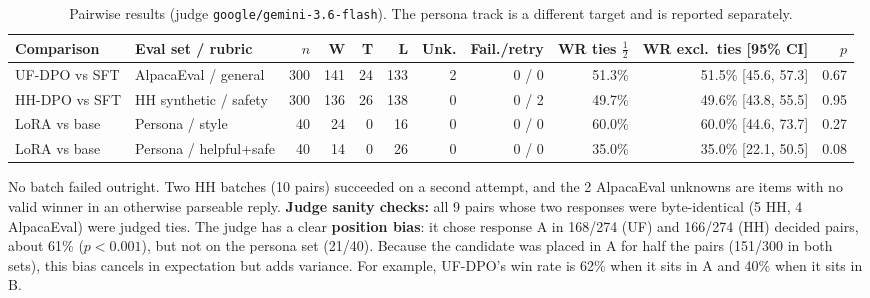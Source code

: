 \documentclass[10pt]{article}
\newcommand{\code}[1]{\texttt{\small #1}}
\begin{document}
\begin{table}[h]
\centering\footnotesize
\setlength{\tabcolsep}{4pt}
\setlength{\tabcolsep}{2.6pt}
\caption{Pairwise results (judge \code{google/gemini-3.6-flash}). The persona track is a different target and is reported separately.}
\label{tab:res}
\begin{tabular}{@{}l l r r r r r r r r r@{}}
\toprule
Comparison & Eval set / rubric & $n$ & W & T & L & Unk. & Fail./retry & WR ties $\frac12$ & WR excl.\ ties [95\% CI] & $p$ \\
\midrule
UF-DPO vs SFT & AlpacaEval / general & 300 & 141 & 24 & 133 & 2 & 0 / 0 & 51.3\% & 51.5\% [45.6, 57.3] & 0.67 \\
HH-DPO vs SFT & HH synthetic / safety & 300 & 136 & 26 & 138 & 0 & 0 / 2 & 49.7\% & 49.6\% [43.8, 55.5] & 0.95 \\
\midrule
LoRA vs base & Persona / style & 40 & 24 & 0 & 16 & 0 & 0 / 0 & 60.0\% & 60.0\% [44.6, 73.7] & 0.27 \\
LoRA vs base & Persona / helpful+safe & 40 & 14 & 0 & 26 & 0 & 0 / 0 & 35.0\% & 35.0\% [22.1, 50.5] & 0.08 \\
\bottomrule
\end{tabular}
\end{table}
\vspace{-0.4em}
No batch failed outright. Two HH batches (10 pairs) succeeded on a second attempt, and the 2 AlpacaEval unknowns are items with no valid winner in an otherwise parseable reply. \textbf{Judge sanity checks:} all 9 pairs whose two responses were byte-identical (5 HH, 4 AlpacaEval) were judged ties. The judge has a clear \textbf{position bias}: it chose response A in 168/274 (UF) and 166/274 (HH) decided pairs, about 61\% ($p<0.001$), but not on the persona set (21/40). Because the candidate was placed in A for half the pairs (151/300 in both sets), this bias cancels in expectation but adds variance. For example, UF-DPO's win rate is 62\% when it sits in A and 40\% when it sits in B.
\end{document}
